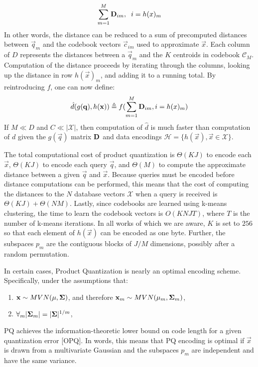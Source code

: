 \begin{align} \label{eq:pqDist}
        \sum_{m=1}^M \mathbf{D}_{im}, \hspace{2mm} i = h(x)_m
\end{align}
In other words, the distance can be reduced to a sum of precomputed distances between $\vec{q}_m$ and the codebook vectors $\vec{c}_{im}$ used to approximate $\vec{x}$. Each column of $D$ represents the distances between a $\vec{q}_m$ and the $K$ centroids in codebook $\mathcal{C}_M$. Computation of the distance proceeds by iterating through the columns, looking up the distance in row $h(\vec{x})_m$, and adding it to a running total. By reintroducing $f$, one can now define:
\begin{align} \label{eq:pq_dhat}
    \hat{d}(g(\mathbf{q}), h(\mathbf{x})) \triangleq f(\sum_{m=1}^M \mathbf{D}_{im}, i = h(x)_m)
\end{align}
If $M \ll D$ and $C \ll |\mathcal{X}|$, then computation of $\hat{d}$ is much faster than computation of $d$ given the $g(\vec{q})$ matrix $\mathbf{D}$ and data encodings $\mathcal{H} = \{h(\vec{x}), \vec{x} \in \mathcal{X} \}$.

The total computational cost of product quantization is $\Theta(KJ)$ to encode each $\vec{x}$, $\Theta(KJ)$ to encode each query $\vec{q}$, and $\Theta(M)$ to compute the approximate distance between a given $\vec{q}$ and $\vec{x}$. Because queries must be encoded before distance computations can be performed, this means that the cost of computing the distances to the $N$ database vectors $\mathcal{X}$ when a query is received is $\Theta(KJ) + \Theta(NM)$. Lastly, since codebooks are learned using k-means clustering, the time to learn the codebook vectors is $O(KNJT)$, where $T$ is the number of k-means iterations. In all works of which we are aware, $K$ is set to $256$ so that each element of $h(\vec{x})$ can be encoded as one byte. Further, the subspaces $p_m$ are the contiguous blocks of $J/M$ dimensions, possibly after a random permutation.

In certain cases, Product Quantization is nearly an optimal encoding scheme. Specifically, under the assumptions that:
\begin{enumerate}
\item $\mathbf{x} \sim MVN(\mathbf{\mu}, \mathbf{\Sigma})$, and therefore $\mathbf{x}_m \sim MVN(\mathbf{\mu}_m, \mathbf{\Sigma}_m)$,
\item $\forall_m |\mathbf{\Sigma}_m| = |\mathbf{\Sigma}|^{1/m}$,
\end{enumerate}
PQ achieves the information-theoretic lower bound on code length for a given quantization error [OPQ]. In words, this means that PQ encoding is optimal if $\vec{x}$ is drawn from a multivariate Gaussian and the subspaces $p_m$ are independent and have the same variance.

